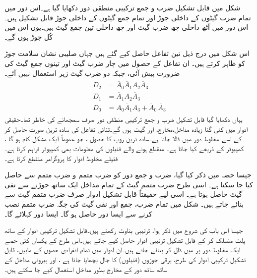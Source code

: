 شکل  میں قابل تشکیل ضرب و جمع ترکیبی منطقی دور دکھایا گیا ہے۔اس دور میں تمام ضرب گیٹوں کے داخلی جوڑ اور تمام جمع گیٹوں کے داخلی جوڑ قابل تشکیل ہیں۔اس دور میں آٹھ داخلی چھ ضرب گیٹ اور چھ داخلی تین جمع گیٹ ہیں۔یوں اس میں کُل جوڑ  ہوں گے۔

اس شکل میں درج ذیل تین تفاعل حاصل کیے گئے ہیں جہاں صلیبی نشان سلامت جوڑ کو ظاہر کرتے ہیں۔ ان تفاعل کے حصول میں چار ضرب گیٹ اور تینوں جمع گیٹ کی ضرورت پیش آئی، جبکہ دو ضرب گیٹ زیر استعمال نہیں آئے۔
\begin{gather}
\begin{aligned}\label{مساوات_قابل_تشکیل_ڈی_مساوات}
D_2&=\overline{A}_0\overline{A}_1 A_2 \overline{A}_3\\
D_1&=\overline{A}_1A_2 \overline{A}_3\\
D_0&=A_0\overline{A}_1A_3+\overline{A}_0\,\overline{A}_3
\end{aligned}
\end{gather}
 یہاں دکھایا گیا قابل تشکیل ضرب و جمع ترکیبی منطقی دور صرف سمجھانے کی خاطر تھا۔حقیقی ادوار میں کئی گنا زیادہ مداخل،مخارج، اور گیٹ ہوں گے۔ثنائی تفاعل کی سادہ ترین صورت حاصل کر کے اسے مخلوط دور میں ڈالا جاتا ہے۔سادہ ترین روپ کا حصول ، جو عموماً ایک مشکل کام ہو گا ، کمپیوٹر کے ذریعے کیا جاتا ہے۔ منقطع ہونے والے فتیلوں کی معلومات بھی کمپیوٹر فراہم کرتا ہے۔فتیلے مخلوط ادوار کا پروگرامر منقطع کرتا ہے۔
 
 جیسا حصہ  میں ذکر کیا گیا، ضرب و جمع دور کو ضرب متمم و ضرب متمم  سے حاصل کیا جا سکتا ہے۔ اسی طرح ضرب متمم گیٹ کے تمام مداخل ایک ساتھ جوڑنے سے نفی گیٹ حاصل ہوتا ہے۔ اسی لیے حقیقتاً قابل تشکیل ادوار صرف ضرب متمم گیٹ سے بنائے جاتے ہیں۔ شکل  میں تمام ضرب،   جمع  اور نفی گیٹ کی جگہ  ضرب متمم  نصب کرنے سے   ایسا دور حاصل ہو گا۔ ایسا دور  کہلائے گا۔


جیسا اس باب کی شروع میں ذکر ہوا،  ترتیبی بناوٹ رکھتے ہیں۔قابل تشکیل ترکیبی ادوار کے ساتھ پلٹ منسلک کر کے قابل تشکیل ترتیبی ادوار حاصل کیے جاتے ہیں۔اس طرح کے یکساں کئی حصے ایک مخلوط دور پر میں ڈال کر  بنائے جاتے ہیں۔ان ادوار میں تمام انفرادی حصوں کے مابین، قابل تشکیل ترکیبی ادوار کی طرح، برقی جوڑوں (فتیلوں) کا جال بچھایا جاتا ہے ، اور بیرونی مداخل کے ساتھ ساتھ دور کے مخارج بطور مداخل استعمال کیے جا سکتے ہیں۔

